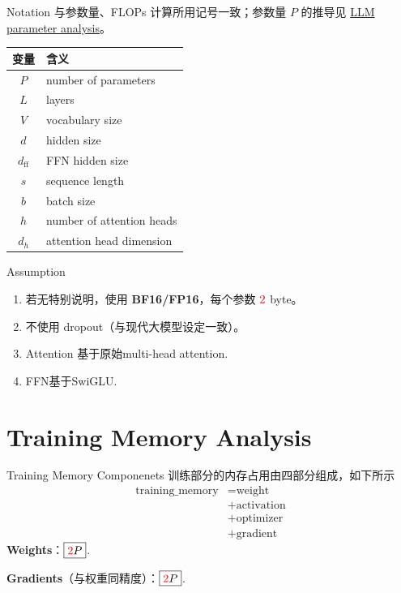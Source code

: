 \documentclass[aspectratio=169]{beamer}
\newcommand{\redtwo}{\textcolor{red}{2}}
\begin{document}
\begin{frame}{Notation}
  \small
  与参数量、FLOPs 计算所用记号一致；参数量 $P$ 的推导见 \href{https://maosong.website/p/llm-parameter-computation/}{LLM parameter analysis}。
  \vspace{0.6em}
  \begin{center}
    \begin{tabular}{@{}cl@{}}
      \toprule
      \textbf{变量} & \textbf{含义} \\
      \midrule
      $P$   & number of parameters \\
      $L$   & layers \\
      $V$   & vocabulary size \\
      $d$   & hidden size \\
      $d_{\mathrm{ff}}$ & FFN hidden size \\
      $s$   & sequence length \\
      $b$   & batch size \\
      $h$   & number of attention heads \\
      $d_h$ & attention head dimension \\
      \bottomrule
    \end{tabular}
  \end{center}
\end{frame}

\begin{frame}{Assumption}
  \begin{enumerate}
    \item 若无特别说明，使用 \textbf{BF16/FP16}，每个参数 $\redtwo$ byte。
    \item 不使用 dropout（与现代大模型设定一致）。
    \item Attention 基于原始multi-head attention.
    \item FFN基于SwiGLU.
  \end{enumerate}
\end{frame}


\section{Training Memory Analysis}

\begin{frame}{Training Memory Componenets}
    训练部分的内存占用由四部分组成，如下所示
    \begin{align}
    \text{training\_memory} &= \text{weight} \\
    &+ \text{activation} \\
    &+ \text{optimizer} \\
    &+\text{gradient}
    \end{align}
    \textbf{Weights}：$\boxed{\redtwo P}$.

    \textbf{Gradients}（与权重同精度）：$\boxed{\redtwo P}$.
\end{frame}
\end{document}
